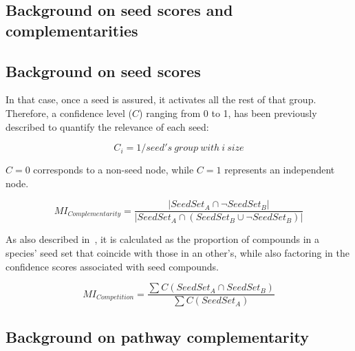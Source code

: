\documentclass[sn-mathphys,Numbered, lineno]{sn-jnl}  %
\theoremstyle{thmstyleone}%
\theoremstyle{thmstyletwo}%
\theoremstyle{thmstylethree}%
\begin{document}
\begin{appendices}

    \section{Background on seed scores and complementarities}
    \label{secA1}

        \subsection{Background on seed scores}

            In that case, once a seed is assured, it activates all the rest of that group.
            Therefore, a confidence level ($C$) ranging from 0 to 1, has been previously described to quantify the relevance of each seed:

            \begin{equation}
                \label{eq:confidence}
                C_i = 1 / seed's\ group\ with \ i \ size
            \end{equation}

            $C=0$ corresponds to a non-seed node, while $C=1$ represents an independent node. 



            \begin{equation}
                \label{eq:mi_complementarity}
                MI_{Complementarity} = \frac{ | SeedSet_A \cap \neg SeedSet_B | }{ | SeedSet_A \cap (SeedSet_B \cup \neg SeedSet_B) | }
            \end{equation}


            As also described in~\cite{phylomint_ms}, it is calculated as the proportion of compounds in a species' seed set that coincide with those in an other's, while also factoring in the confidence scores associated with seed compounds.

            \begin{equation}
                \label{eq:mi_competition}
                MI_{Competition} = \frac{ \sum C (SeedSet_A \cap SeedSet_B) }{ \sum{ C (SeedSet_A )} }
            \end{equation}


        \subsection{Background on pathway complementarity}


\end{appendices}
\end{document}
